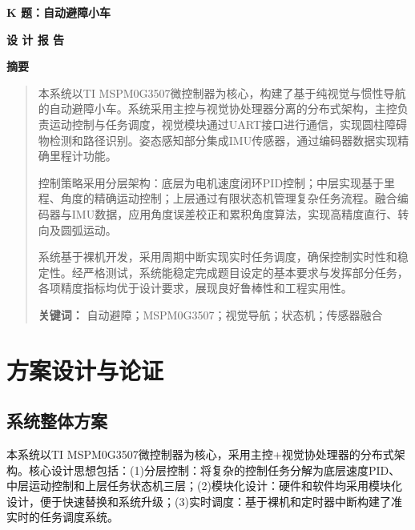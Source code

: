\documentclass[UTF8]{ctexart}
\begin{document}
	\thispagestyle{empty}
	\vspace*{1cm}
	\begin{center}
		{\huge \bfseries K 题：自动避障小车}
		\vspace{0.5cm}
		
		{\Large \bfseries 设 计 报 告}
		
		\vspace{1cm}
		
		{\Large \bfseries 摘\quad 要}
	\end{center}
	\begin{quote}
		\quad \quad 本系统以TI MSPM0G3507微控制器为核心，构建了基于纯视觉与惯性导航的自动避障小车。系统采用主控与视觉协处理器分离的分布式架构，主控负责运动控制与任务调度，视觉模块通过UART接口进行通信，实现圆柱障碍物检测和路径识别。姿态感知部分集成IMU传感器，通过编码器数据实现精确里程计功能。
		
		\quad \quad 控制策略采用分层架构：底层为电机速度闭环PID控制；中层实现基于里程、角度的精确运动控制；上层通过有限状态机管理复杂任务流程。融合编码器与IMU数据，应用角度误差校正和累积角度算法，实现高精度直行、转向及圆弧运动。
		
		\quad \quad 系统基于裸机开发，采用周期中断实现实时任务调度，确保控制实时性和稳定性。经严格测试，系统能稳定完成题目设定的基本要求与发挥部分任务，各项精度指标均优于设计要求，展现良好鲁棒性和工程实用性。
		
	
		\vspace{0.5cm}
		\noindent
		\textbf{关键词：} 自动避障；MSPM0G3507；视觉导航；状态机；传感器融合
	\end{quote}
		
	\newpage
	\setcounter{page}{1} %
	
	
	\section{方案设计与论证}
	
	\subsection{系统整体方案}
	本系统以TI MSPM0G3507微控制器为核心，采用主控+视觉协处理器的分布式架构。核心设计思想包括：(1)分层控制：将复杂的控制任务分解为底层速度PID、中层运动控制和上层任务状态机三层；(2)模块化设计：硬件和软件均采用模块化设计，便于快速替换和系统升级；(3)实时调度：基于裸机和定时器中断构建了准实时的任务调度系统。
	
\end{document}
